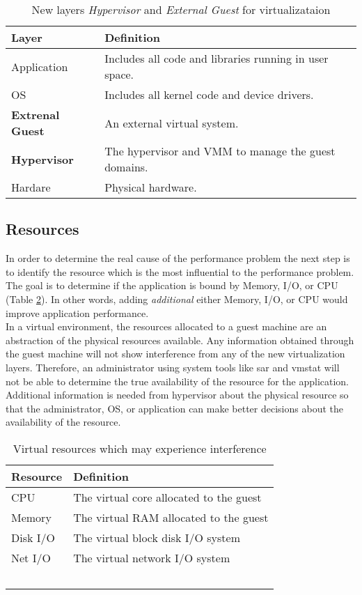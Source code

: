 \begin{table}
\begin{tabular}{ l p{10cm} }
  Layer & Definition \\
  \hline
  Application & Includes all code and libraries running in user space. \\
  OS & Includes all kernel code and device drivers. \\
  \textbf{Extrenal Guest} & An external virtual system. \\
  \textbf{Hypervisor} & The hypervisor and VMM to manage the guest domains. \\
  Hardare & Physical hardware. \\
  \hline
\end{tabular}
\caption{New layers \emph{Hypervisor} and \emph{External Guest} for virtualizataion}
\label{tab:layers}
\end{table}

\subsection{Resources}
In order to determine the real cause of the performance problem the next step is to identify the resource which is the most influential to the performance problem.  
The goal is to determine if the application is bound by Memory, I/O, or CPU (Table \ref{tab:resources}).  In other words, adding \emph{additional} either Memory, I/O, or CPU would improve application performance. \\
\indent In a virtual environment, the resources allocated to a guest machine are an abstraction of the physical resources available.  
Any information obtained through the guest machine will not show interference from any of the new virtualization layers.  
Therefore, an administrator using system tools like sar and vmstat will not be able to determine the true availability of the resource for the application.  
Additional information is needed from hypervisor about the physical resource so that the administrator, OS, or application can make better decisions about the availability of the resource. 

\begin{table}
  \begin{tabular}{ l p{10cm} }
    Resource & Definition \\
    \hline
    CPU & The virtual core allocated to the guest \\
    Memory & The virtual RAM allocated to the guest \\
    Disk I/O & The virtual block disk I/O system \\
    Net I/O & The virtual network I/O system \\
    \hline
  \end{tabular}
\caption{Virtual resources which may experience interference}
\label{tab:resources}
\end{table}

